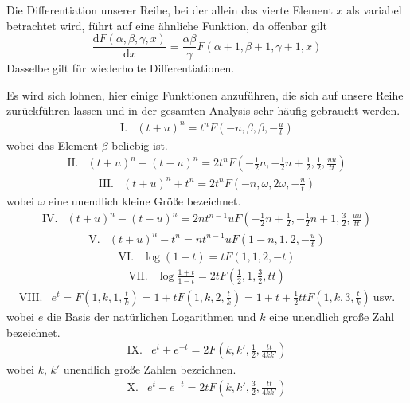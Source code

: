 Die Differentiation unserer Reihe, bei der allein das vierte Element $x$ als variabel betrachtet wird, führt auf eine ähnliche Funktion, da offenbar gilt
\[
\frac{\mathrm{d}F(\alpha,\beta,\gamma,x)}{\mathrm{d}x}
=\frac{\alpha\beta}{\gamma}F(\alpha+1,\beta+1,\gamma+1,x)
\]
Dasselbe gilt für wiederholte Differentiationen.

Es wird sich lohnen, hier einige Funktionen anzuführen, die sich auf unsere Reihe zurückführen lassen und in der gesamten Analysis sehr häufig gebraucht werden.
\[
\begin{array}{rl}
\mathrm{I.}&(t+u)^n=t^nF(-n,\beta,\beta,-\frac{u}{t})
\end{array}
\]
wobei das Element $\beta$ beliebig ist.
\[
\begin{array}{rl}
\mathrm{II.}&(t+u)^n+(t-u)^n=2t^nF(-\frac{1}{2}n,-\frac{1}{2}n+\frac{1}{2},\frac{1}{2},\frac{uu}{tt})
\end{array}
\]
\[
\begin{array}{rl}
\mathrm{III.}&(t+u)^n+t^n=2t^nF(-n,\omega,2\omega,-\frac{u}{t})
\end{array}
\]
wobei $\omega$ eine unendlich kleine Größe bezeichnet.
\[
\begin{array}{rl}
\mathrm{IV.}&(t+u)^n-(t-u)^n=2nt^{n-1}uF(-\frac{1}{2}n+\frac{1}{2},-\frac{1}{2}n+1,\frac{3}{2},\frac{uu}{tt})
\end{array}
\]
\[
\begin{array}{rl}
\mathrm{V.}&(t+u)^n-t^n=nt^{n-1}uF(1-n,1.\ 2,-\frac{u}{t})
\end{array}
\]
\[
\begin{array}{rl}
\mathrm{VI.}&\log(1+t)=tF(1,1,2,-t)
\end{array}
\]
\[
\begin{array}{rl}
\mathrm{VII.}&\log\frac{1+t}{1-t}=2tF(\frac{1}{2},1,\frac{3}{2},tt)
\end{array}
\]
\[
\begin{array}{rl}
\mathrm{VIII.}&e^t=F(1,k,1,\frac{t}{k})=1+tF(1,k,2,\frac{t}{k})=1+t+\frac{1}{2}ttF(1,k,3,\frac{t}{k})\ \mbox{usw.}
\end{array}
\]
wobei $e$ die Basis der natürlichen Logarithmen und $k$ eine unendlich große Zahl bezeichnet.
\[
\begin{array}{rl}
\mathrm{IX.}&e^t+e^{-t}=2F(k,k',\frac{1}{2},\frac{tt}{4kk'})
\end{array}
\]
wobei $k$, $k'$ unendlich große Zahlen bezeichnen.
\[
\begin{array}{rl}
\mathrm{X.}&e^t-e^{-t}=2tF(k,k',\frac{3}{2},\frac{tt}{4kk'})
\end{array}
\]
